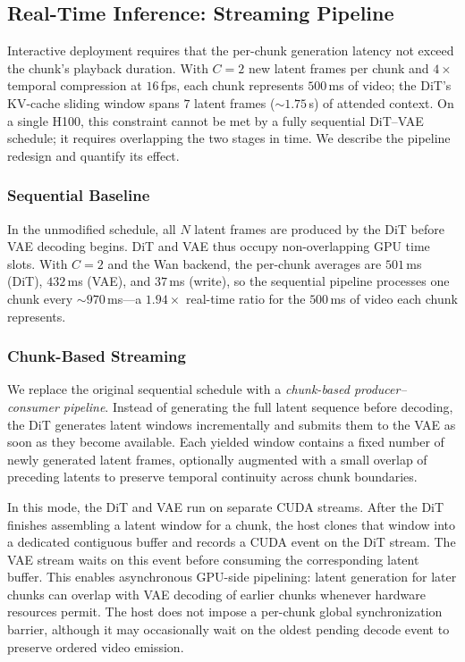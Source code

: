 \subsection{Real-Time Inference: Streaming Pipeline}
\label{app:realtime_pipeline}

Interactive deployment requires that the per-chunk generation latency not exceed the chunk's playback duration. With $C{=}2$ new latent frames per chunk and $4\times$ temporal compression at $16$\,fps, each chunk represents $500$\,ms of video; the DiT's KV-cache sliding window spans $7$ latent frames (${\sim}1.75$\,s) of attended context. On a single H100, this constraint cannot be met by a fully sequential DiT--VAE schedule; it requires overlapping the two stages in time. We describe the pipeline redesign and quantify its effect.

\subsubsection{Sequential Baseline}

In the unmodified schedule, all $N$ latent frames are produced by the DiT before VAE decoding begins. DiT and VAE thus occupy non-overlapping GPU time slots. With $C{=}2$ and the Wan backend, the per-chunk averages are $501$\,ms (DiT), $432$\,ms (VAE), and $37$\,ms (write), so the sequential pipeline processes one chunk every ${\sim}970$\,ms---a $1.94\times$ real-time ratio for the $500$\,ms of video each chunk represents.

\subsubsection{Chunk-Based Streaming}

We replace the original sequential schedule with a \emph{chunk-based producer--consumer pipeline}. Instead of generating the full latent sequence before decoding, the DiT generates latent windows incrementally and submits them to the VAE as soon as they become available. Each yielded window contains a fixed number of newly generated latent frames, optionally augmented with a small overlap of preceding latents to preserve temporal continuity across chunk boundaries.

In this mode, the DiT and VAE run on separate CUDA streams. After the DiT finishes assembling a latent window for a chunk, the host clones that window into a dedicated contiguous buffer and records a CUDA event on the DiT stream. The VAE stream waits on this event before consuming the corresponding latent buffer. This enables asynchronous GPU-side pipelining: latent generation for later chunks can overlap with VAE decoding of earlier chunks whenever hardware resources permit. The host does not impose a per-chunk global synchronization barrier, although it may occasionally wait on the oldest pending decode event to preserve ordered video emission.



